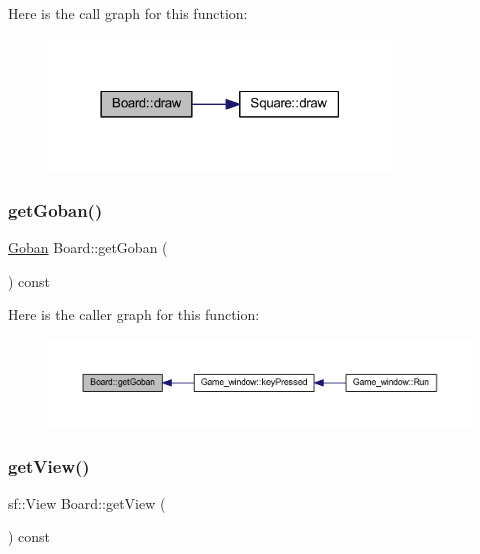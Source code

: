 Here is the call graph for this function\+:\nopagebreak
\begin{figure}[H]
\begin{center}
\leavevmode
\includegraphics[width=258pt]{class_board_a8c86104f9ff30a54cbd7520e006cd609_cgraph}
\end{center}
\end{figure}
\mbox{\label{class_board_a19af96f42f5c38336010da2983abbf5c}} 
\subsubsection{\texorpdfstring{get\+Goban()}{getGoban()}}
{\footnotesize\ttfamily \hyperlink{class_goban}{Goban} Board\+::get\+Goban (\begin{DoxyParamCaption}{ }\end{DoxyParamCaption}) const}

Here is the caller graph for this function\+:\nopagebreak
\begin{figure}[H]
\begin{center}
\leavevmode
\includegraphics[width=350pt]{class_board_a19af96f42f5c38336010da2983abbf5c_icgraph}
\end{center}
\end{figure}
\mbox{\label{class_board_ad3c413e185668418d3a16c1fec68e70d}} 
\subsubsection{\texorpdfstring{get\+View()}{getView()}}
{\footnotesize\ttfamily sf\+::\+View Board\+::get\+View (\begin{DoxyParamCaption}{ }\end{DoxyParamCaption}) const}

